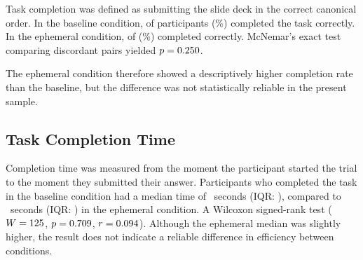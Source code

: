 Task completion was defined as submitting the slide deck in the correct canonical order. In the baseline condition, \GenCompNBaseline{} of \GenNValid{} participants (\GenCompPctBaseline{}\%) completed the task correctly. In the ephemeral condition, \GenCompNEphemeral{} of \GenNValid{} (\GenCompPctEphemeral{}\%) completed correctly. McNemar's exact test comparing discordant pairs yielded $p = 0.250{}$.

The ephemeral condition therefore showed a descriptively higher completion rate than the baseline, but the difference was not statistically reliable in the present sample.

\subsection{Task Completion Time}

%

Completion time was measured from the moment the participant started the trial to the moment they submitted their answer. Participants who completed the task in the baseline condition had a median time of \GenTimeBaselineMdn{}~seconds (IQR: \GenTimeBaselineIqr{}), compared to \GenTimeEphemeralMdn{}~seconds (IQR: \GenTimeEphemeralIqr{}) in the ephemeral condition. A Wilcoxon signed-rank test \GenTimeWilcoxonResult{} ($W = 125$, $p = 0.709$, $r = 0.094$). Although the ephemeral median was slightly higher, the result does not indicate a reliable difference in efficiency between conditions.

